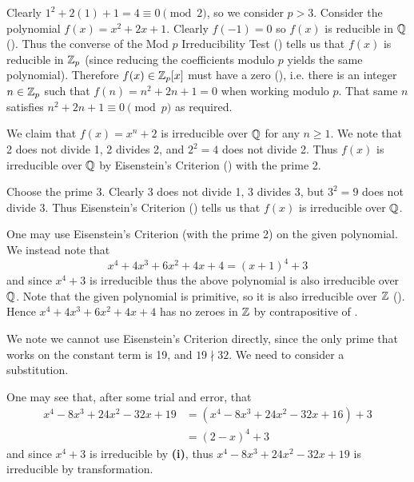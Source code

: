 \begin{questions}
    \item Clearly $1^2 + 2(1) + 1 = 4 \equiv 0 \pmod2$, so we consider $p > 3$. Consider the polynomial $f(x) = x^2 + 2x + 1$. Clearly $f(-1) = 0$ so $f(x)$ is reducible in $\mathbb{Q}$ (). Thus the converse of the Mod $p$ Irreducibility Test () tells us that $f(x)$ is reducible in $\mathbb{Z}_p$ (since reducing the coefficients modulo $p$ yields the same polynomial). Therefore $f(x) \in \mathbb{Z}_p[x]$ must have a zero (), i.e. there is an integer $n \in \mathbb{Z}_p$ such that $f(n) = n^2 + 2n + 1 = 0$ when working modulo $p$. That same $n$ satisfies $n^2 + 2n + 1 \equiv 0 \pmod{p}$ as required.

    \item We claim that $f(x) = x^n + 2$ is irreducible over $\mathbb{Q}$ for any $n \geq 1$. We note that 2 does not divide 1, 2 divides 2, and $2^2 = 4$ does not divide 2. Thus $f(x)$ is irreducible over $\mathbb{Q}$ by Eisenstein's Criterion () with the prime 2.

    \item \begin{partquestions}{\roman*}
        \item Choose the prime 3. Clearly 3 does not divide 1, 3 divides 3, but $3^2 = 9$ does not divide 3. Thus Eisenstein's Criterion () tells us that $f(x)$ is irreducible over $\mathbb{Q}$.

        \item One may use Eisenstein's Criterion (with the prime 2) on the given polynomial. We instead note that
        \[
            x^4 + 4x^3 + 6x^2 + 4x + 4 = (x+1)^4 + 3
        \]
        and since $x^4 + 3$ is irreducible thus the above polynomial is also irreducible over $\mathbb{Q}$. Note that the given polynomial is primitive, so it is also irreducible over $\mathbb{Z}$ (). Hence $x^4 + 4x^3 + 6x^2 + 4x + 4$ has no zeroes in $\mathbb{Z}$ by contrapositive of .

        \item We note we cannot use Eisenstein's Criterion directly, since the only prime that works on the constant term is 19, and $19 \nmid 32$. We need to consider a substitution.

        One may see that, after some trial and error, that
        \begin{align*}
            x^4 - 8x^3 + 24x^2 - 32x + 19 &= (x^4 - 8x^3 + 24x^2 - 32x + 16) + 3\\
            &= (2-x)^4 + 3
        \end{align*}
        and since $x^4 + 3$ is irreducible by \textbf{(i)}, thus $x^4 - 8x^3 + 24x^2 - 32x + 19$ is irreducible by transformation.
    \end{partquestions}


\end{questions}
